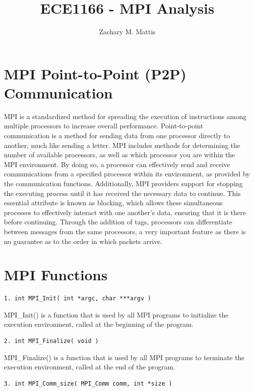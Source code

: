 \documentclass[12pt, letterpaper]{report}
\title{ECE1166 - MPI Analysis}
\author{Zachary M. Mattis}
\begin{document}
	
\maketitle


\section{MPI Point-to-Point (P2P) Communication}

MPI is a standardized method for spreading the execution of instructions among multiple processors to increase overall performance. Point-to-point communication is a method for sending data from one processor directly to another, much like sending a letter. MPI includes methods for determining the number of available processors, as well as which processor you are within the MPI environment. By doing so, a processor can effectively send and receive communications from a specified processor within its environment, as provided by the communication functions. Additionally, MPI providers support for stopping the executing process until it has received the necessary data to continue. This essential attribute is known as blocking, which allows these simultaneous processes to effectively interact with one another's data, ensuring that it is there before continuing. Through the addition of tags, processors can differentiate between messages from the same processors, a very important feature as there is no guarantee as to the order in which packets arrive.

\section{MPI Functions}

\begin{verbatim}
1. int MPI_Init( int *argc, char ***argv )
\end{verbatim}

MPI\_Init() is a function that is used by all MPI programs to initialize the execution environment, called at the beginning of the program.

\begin{verbatim}
2. int MPI_Finalize( void )
\end{verbatim}

MPI\_Finalize() is a function that is used by all MPI programs to terminate the execution environment, called at the end of the program.

\begin{verbatim}
3. int MPI_Comm_size( MPI_Comm comm, int *size )
\end{verbatim}
\end{document}
